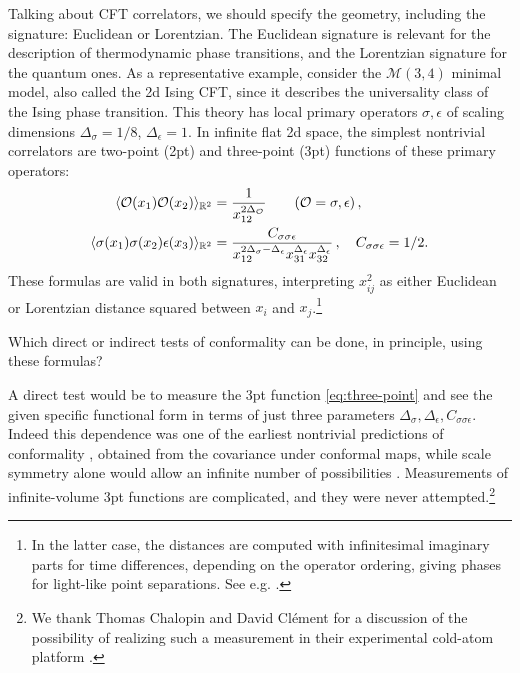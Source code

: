 \documentclass[a4paper,11pt]{article}
\theoremstyle{remark}
\theoremstyle{theorem}
\begin{document}
Talking about CFT correlators, we should specify the geometry, including the
signature: Euclidean or Lorentzian. The Euclidean signature is relevant for the
description of thermodynamic phase transitions, and the Lorentzian signature for
the quantum ones. As a representative example, consider the $\mathcal{M} (3,
4)$ minimal model, also called the 2d Ising CFT, since it describes the
universality class of the Ising phase transition. This theory has local
primary operators $\sigma, \epsilon$ of scaling dimensions $\Delta_{\sigma} =
1 / 8$, $\Delta_{\epsilon} = 1$. In infinite flat 2d space, the simplest
nontrivial correlators are two-point (2pt) and three-point (3pt) functions of
these primary operators:
\begin{align}
	\langle \mathcal{O}(x_1)\mathcal{O}(x_2) \rangle_{\mathbb{R}^2} & =
	\frac{1}{x_{12}^{2 \Delta_{\mathcal{O}}}}  \qquad (\mathcal{O}= \sigma,
	\epsilon) \hspace{0.17em},  \label{eq:two-point}\\
	\langle \sigma (x_1) \sigma (x_2) \epsilon (x_3) \rangle_{\mathbb{R}^2} & =
	\frac{C_{\sigma \sigma \epsilon}}{x_{12}^{2 \Delta_{\sigma} -
			\Delta_{\epsilon}} x_{31}^{\Delta_{\epsilon}} x_{32}^{\Delta_{\epsilon}}}
	\hspace{0.17em}, \quad C_{\sigma \sigma \epsilon} = 1 / 2. 
	\label{eq:three-point}
\end{align}
These formulas are valid in both signatures, interpreting $x^2_{ij}$ as either
Euclidean or Lorentzian distance squared between $x_i$ and $x_j$.\footnote{In
	the latter case, the distances are computed with infinitesimal imaginary parts
	for time differences, depending on the operator ordering, giving phases for
	light-like point separations. See e.g. {\cite{Hofman:2008ar}}.}

Which direct or indirect tests of conformality can be done, in principle, using
these formulas?

A direct test would be to measure the 3pt function \eqref{eq:three-point} and
see the given specific functional form in terms of just three parameters
$\Delta_{\sigma}, \Delta_{\epsilon}, C_{\sigma \sigma \epsilon}$. Indeed this
dependence was one of the earliest nontrivial predictions of conformality {\cite{Polyakov:1970xd}}, obtained from the covariance under conformal
maps, while scale symmetry alone would allow an infinite number of
possibilities {\cite{Rychkov:2016iqz}}. Measurements of infinite-volume 3pt
functions are complicated, and they were never attempted.\footnote{We thank
	Thomas Chalopin and David Cl{\'e}ment for a discussion of the possibility of
	realizing such a measurement in their experimental cold-atom platform
	{\cite{Allemand:2025pdq}}.} 
\end{document}
